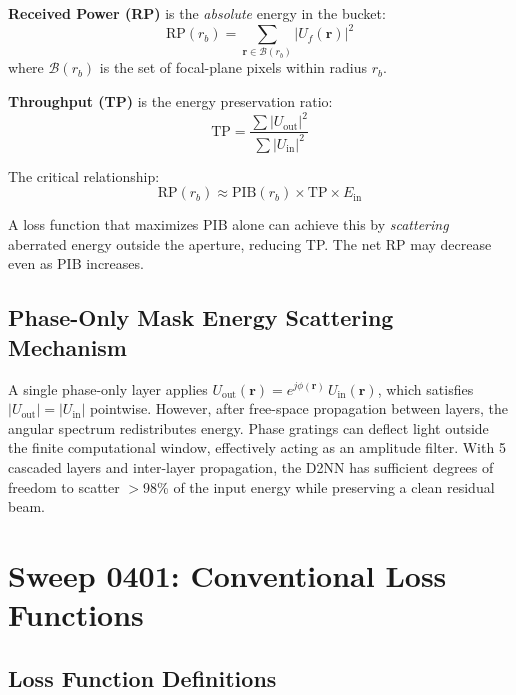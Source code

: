 \documentclass[11pt,a4paper]{article}
\begin{document}
\textbf{Received Power (RP)} is the \textit{absolute} energy in the bucket:
\begin{equation}
\mathrm{RP}(r_b) = \sum_{\mathbf{r} \in \mathcal{B}(r_b)} |U_f(\mathbf{r})|^2
\end{equation}
where $\mathcal{B}(r_b)$ is the set of focal-plane pixels within radius $r_b$.

\textbf{Throughput (TP)} is the energy preservation ratio:
\begin{equation}
\mathrm{TP} = \frac{\sum |U_{\mathrm{out}}|^2}{\sum |U_{\mathrm{in}}|^2}
\end{equation}

The critical relationship:
\begin{equation}
\boxed{\mathrm{RP}(r_b) \approx \mathrm{PIB}(r_b) \times \mathrm{TP} \times E_{\mathrm{in}}}
\label{eq:rp}
\end{equation}

A loss function that maximizes PIB alone can achieve this by \textit{scattering} aberrated energy outside the aperture, reducing TP. The net RP may decrease even as PIB increases.

\subsection{Phase-Only Mask Energy Scattering Mechanism}

A single phase-only layer applies $U_{\mathrm{out}}(\mathbf{r}) = e^{j\phi(\mathbf{r})}\, U_{\mathrm{in}}(\mathbf{r})$, which satisfies $|U_{\mathrm{out}}| = |U_{\mathrm{in}}|$ pointwise. However, after free-space propagation between layers, the angular spectrum redistributes energy. Phase gratings can deflect light outside the finite computational window, effectively acting as an amplitude filter. With 5 cascaded layers and inter-layer propagation, the D2NN has sufficient degrees of freedom to scatter $>$98\% of the input energy while preserving a clean residual beam.

\section{Sweep 0401: Conventional Loss Functions}
\label{sec:0401}

\subsection{Loss Function Definitions}
\end{document}
